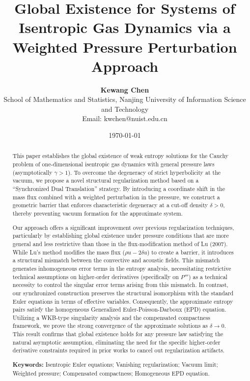 \documentclass[12pt, reqno]{article}
\title{Global Existence for Systems of Isentropic Gas Dynamics via a Weighted Pressure Perturbation Approach}
\author{
  \textbf{Kewang Chen} \\
  \small{School of Mathematics and Statistics, Nanjing University of Information Science and Technology} \\
  \small{Email: kwchen@nuist.edu.cn}
}
\date{\today}
\theoremstyle{definition}
\numberwithin{equation}{section}
\begin{document}
\maketitle

\begin{abstract}
This paper establishes the global existence of weak entropy solutions for the Cauchy problem of one-dimensional isentropic gas dynamics with general pressure laws (asymptotically $\gamma > 1$). To overcome the degeneracy of strict hyperbolicity at the vacuum, we propose a novel structural regularization method based on a ``Synchronized Dual Translation'' strategy. By introducing a coordinate shift in the mass flux combined with a weighted perturbation in the pressure, we construct a geometric barrier that enforces characteristic degeneracy at a cut-off density $\delta > 0$, thereby preventing vacuum formation for the approximate system.

Our approach offers a significant improvement over previous regularization techniques, particularly by establishing global existence under pressure conditions that are more general and less restrictive than those in the flux-modification method of Lu (2007). While Lu's method modifies the mass flux ($\rho u - 2\delta u$) to create a barrier, it introduces a structural mismatch between the convective and acoustic fields. This mismatch generates inhomogeneous error terms in the entropy analysis, necessitating restrictive technical assumptions on higher-order derivatives (specifically on $P'''$) as a technical necessity to control the singular error terms arising from this mismatch. In contrast, our synchronized construction preserves the structural isomorphism with the standard Euler equations in terms of effective variables. Consequently, the approximate entropy pairs satisfy the homogeneous Generalized Euler-Poisson-Darboux (EPD) equation. Utilizing a WKB-type singularity analysis and the compensated compactness framework, we prove the strong convergence of the approximate solutions as $\delta \to 0$. This result confirms that global existence holds for any pressure law satisfying the natural asymptotic assumption, eliminating the need for the specific higher-order derivative constraints required in prior works to cancel out regularization artifacts.

\vspace{0.5em}
\noindent \textbf{Keywords:} Isentropic Euler equations; Vanishing regularization; Vacuum limit; Weighted pressure; Compensated compactness; Homogeneous EPD equation.
\end{abstract}
\end{document}
